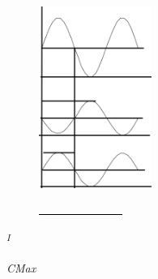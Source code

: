 \documentclass[12pt]{article}
\begin{document}

\begin{figure}[H]
\advance\leftskip 2.4in		\includegraphics[width=1.45in,height=2.33in]{./media/image10.png}
\end{figure}



\par




\begin{figure}[H]
	\begin{Center}
		\includegraphics[width=1.07in,height=0.02in]{./media/image11.png}
	\end{Center}
\end{figure}



\begin{adjustwidth}{2.17in}{0.0in}
\textit{\textsuperscript{I}}{\fontsize{5pt}{6.0pt}\selectfont \textit{CMax }\par}\par

\end{adjustwidth}



\end{document}

